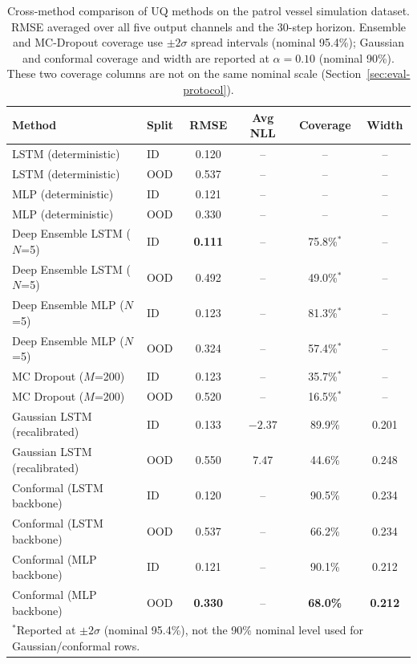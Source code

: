 \documentclass[a4paper,fleqn]{cas-sc}
\begin{document}
\begin{table}[t]
\centering
\caption{Cross-method comparison of UQ methods on the patrol vessel simulation dataset. RMSE averaged over all five output channels and the 30-step horizon. Ensemble and MC-Dropout coverage use $\pm2\sigma$ spread intervals (nominal 95.4\%); Gaussian and conformal coverage and width are reported at $\alpha=0.10$ (nominal 90\%). These two coverage columns are not on the same nominal scale (Section~\ref{sec:eval-protocol}).}
\label{tab:uq-summary}
\begin{tabular}{llcccc}
\toprule
\textbf{Method} & \textbf{Split} & \textbf{RMSE} & \textbf{Avg NLL} & \textbf{Coverage} & \textbf{Width} \\
\midrule
LSTM (deterministic) & ID  & 0.120 & -- & -- & -- \\
LSTM (deterministic) & OOD & 0.537 & -- & -- & -- \\
MLP (deterministic)  & ID  & 0.121 & -- & -- & -- \\
MLP (deterministic)  & OOD & 0.330 & -- & -- & -- \\
\midrule
Deep Ensemble LSTM ($N$=5) & ID  & \textbf{0.111} & -- & 75.8\%$^{*}$ & -- \\
Deep Ensemble LSTM ($N$=5) & OOD & 0.492          & -- & 49.0\%$^{*}$ & -- \\
Deep Ensemble MLP ($N$=5)  & ID  & 0.123          & -- & 81.3\%$^{*}$ & -- \\
Deep Ensemble MLP ($N$=5)  & OOD & 0.324          & -- & 57.4\%$^{*}$ & -- \\
\midrule
MC Dropout ($M$=200)       & ID  & 0.123 & -- & 35.7\%$^{*}$ & -- \\
MC Dropout ($M$=200)       & OOD & 0.520 & -- & 16.5\%$^{*}$ & -- \\
\midrule
Gaussian LSTM (recalibrated) & ID  & 0.133 & $-2.37$ & 89.9\% & 0.201 \\
Gaussian LSTM (recalibrated) & OOD & 0.550 & $7.47$  & 44.6\% & 0.248 \\
\midrule
Conformal (LSTM backbone)  & ID  & 0.120 & -- & 90.5\% & 0.234 \\
Conformal (LSTM backbone)  & OOD & 0.537 & -- & 66.2\% & 0.234 \\
Conformal (MLP backbone)   & ID  & 0.121 & -- & 90.1\% & 0.212 \\
Conformal (MLP backbone)   & OOD & \textbf{0.330} & -- & \textbf{68.0\%} & \textbf{0.212} \\
\bottomrule
\multicolumn{6}{l}{\footnotesize $^{*}$Reported at $\pm2\sigma$ (nominal 95.4\%), not the 90\% nominal level used for Gaussian/conformal rows.}
\end{tabular}
\end{table}
\end{document}
